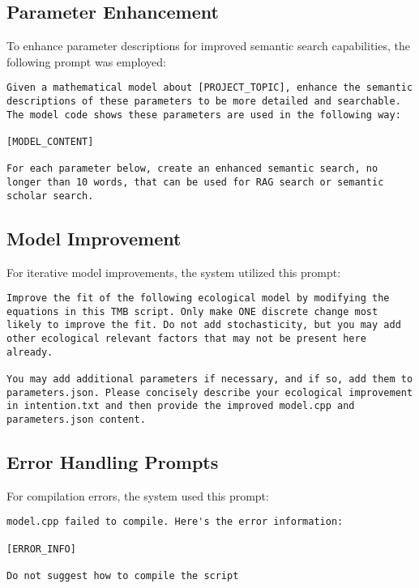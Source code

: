 \subsection{Parameter Enhancement}
\label{subsec:parameter_enhancement_prompt}

To enhance parameter descriptions for improved semantic search capabilities, the following prompt was employed:

\begin{lstlisting}
Given a mathematical model about [PROJECT_TOPIC], enhance the semantic descriptions of these parameters to be more detailed and searchable. The model code shows these parameters are used in the following way:

[MODEL_CONTENT]

For each parameter below, create an enhanced semantic search, no longer than 10 words, that can be used for RAG search or semantic scholar search.
\end{lstlisting}

\subsection{Model Improvement}
\label{subsec:model_improvement_prompt}

For iterative model improvements, the system utilized this prompt:

\begin{lstlisting}
Improve the fit of the following ecological model by modifying the equations in this TMB script. Only make ONE discrete change most likely to improve the fit. Do not add stochasticity, but you may add other ecological relevant factors that may not be present here already.

You may add additional parameters if necessary, and if so, add them to parameters.json. Please concisely describe your ecological improvement in intention.txt and then provide the improved model.cpp and parameters.json content.

\end{lstlisting}

\subsection{Error Handling Prompts}
\label{subsec:error_handling_prompt}

For compilation errors, the system used this prompt:

\begin{lstlisting}
model.cpp failed to compile. Here's the error information:

[ERROR_INFO]

Do not suggest how to compile the script
\end{lstlisting}

